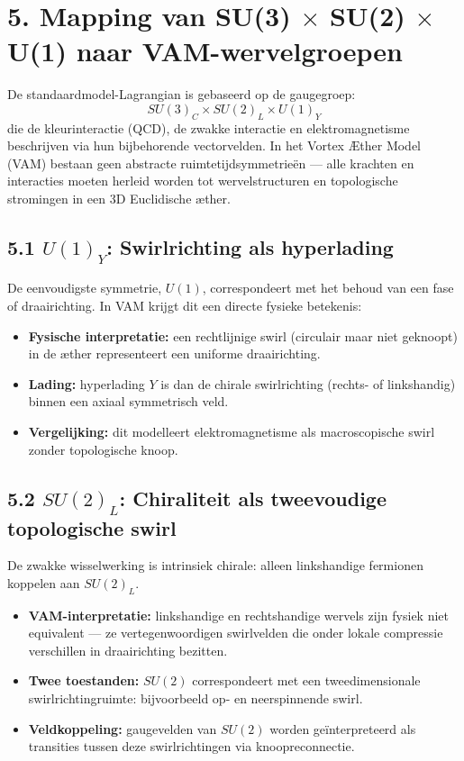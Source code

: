 \section*{5. Mapping van SU(3) \texorpdfstring{$\times$}{x} SU(2) \texorpdfstring{$\times$}{x} U(1) naar VAM-wervelgroepen}

De standaardmodel-Lagrangian is gebaseerd op de gaugegroep:
\[
    SU(3)_C \times SU(2)_L \times U(1)_Y
\]
die de kleurinteractie (QCD), de zwakke interactie en elektromagnetisme beschrijven via hun bijbehorende vectorvelden. In het Vortex Æther Model (VAM) bestaan geen abstracte ruimtetijdsymmetrieën — alle krachten en interacties moeten herleid worden tot wervelstructuren en topologische stromingen in een 3D Euclidische æther.

\subsection*{5.1 $U(1)_Y$: Swirlrichting als hyperlading}
De eenvoudigste symmetrie, $U(1)$, correspondeert met het behoud van een fase of draairichting. In VAM krijgt dit een directe fysieke betekenis:
\begin{itemize}
    \item \textbf{Fysische interpretatie:} een rechtlijnige swirl (circulair maar niet geknoopt) in de æther representeert een uniforme draairichting.
    \item \textbf{Lading:} hyperlading $Y$ is dan de chirale swirlrichting (rechts- of linkshandig) binnen een axiaal symmetrisch veld.
    \item \textbf{Vergelijking:} dit modelleert elektromagnetisme als macroscopische swirl zonder topologische knoop.
\end{itemize}

\subsection*{5.2 $SU(2)_L$: Chiraliteit als tweevoudige topologische swirl}
De zwakke wisselwerking is intrinsiek chirale: alleen linkshandige fermionen koppelen aan $SU(2)_L$.
\begin{itemize}
    \item \textbf{VAM-interpretatie:} linkshandige en rechtshandige wervels zijn fysiek niet equivalent — ze vertegenwoordigen swirlvelden die onder lokale compressie verschillen in draairichting bezitten.
    \item \textbf{Twee toestanden:} $SU(2)$ correspondeert met een tweedimensionale swirlrichtingruimte: bijvoorbeeld op- en neerspinnende swirl.
    \item \textbf{Veldkoppeling:} gaugevelden van $SU(2)$ worden geïnterpreteerd als transities tussen deze swirlrichtingen via knoopreconnectie.
\end{itemize}

